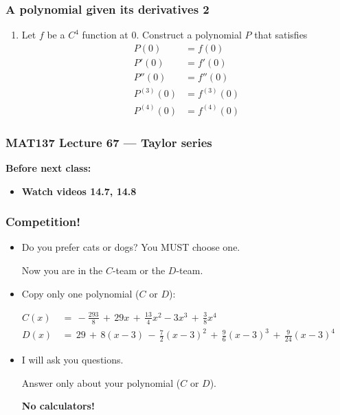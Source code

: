 \documentclass[14pt]{beamer}
\newcommand{\p}{\pause}
\newcommand{\setsize}[1]{\fontsize{#1}{#1}\selectfont} %
\newcommand{\smallerfont}{\setsize{13}} %
\begin{document}
	\begin{frame}[t]
		\smallerfont
		\frametitle{A polynomial given its derivatives 2}

		\begin{enumerate}
			\item Let $f$ be a $C^4$ function at $0$. Construct a polynomial $P$ that satisfies
				\begin{align*}
					P(0) &= f(0)\\
					P'(0) &= f'(0)\\
					P''(0) &= f''(0)\\
					P^{(3)}(0) &= f^{(3)}(0)\\
					P^{(4)}(0) &= f^{(4)}(0)
				\end{align*}
		\end{enumerate}
	\end{frame}




\begin{frame}
	\frametitle{MAT137 Lecture 67 --- Taylor series }

	\vfill
	{\bf Before next class:}
		\begin{itemize} \normalsize
			\item {\bf Watch videos 14.7, 14.8 }
		\end{itemize}
\end{frame}

	\begin{frame}[t]
		\frametitle{Competition!}

		\begin{itemize}
			\item Do you prefer cats or dogs? You MUST choose one.

				\p Now you are in the $C$-team or the $D$-team.

				\p

			\item Copy only one polynomial ($C$ or $D$):
		\end{itemize}
		{\smallerfont \begin{align*}C(x)&\, = \, -\frac{293}{8}\, + \, 29x \, + \, \frac{13}{4}x^{2}-3x^{3} \, + \, \frac{3}{8}x^{4} \phantom{\int}\\ D(x)&\, = \, 29 \, + \, 8(x -3) \, - \, \frac{7}{2}(x-3)^{2} \, + \, \frac{9}{6}(x-3)^{3} \, + \, \frac{9}{24}(x-3)^{4}\end{align*} }
		\begin{itemize}
			\item I will ask you questions.

				Answer only about your polynomial ($C$ or $D$).

				{\bf No calculators!}
		\end{itemize}
	\end{frame}
\end{document}
